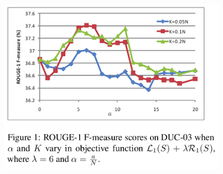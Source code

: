 \documentclass[xcolor={table}]{beamer}
\begin{document}
\begin{frame}[t]{\cite{lin2011class}}
      \begin{figure}[h]
      \includegraphics[scale=.26]{images/figure1-lin11.png} \\
  \end{figure}
\end{frame}
\end{document}

